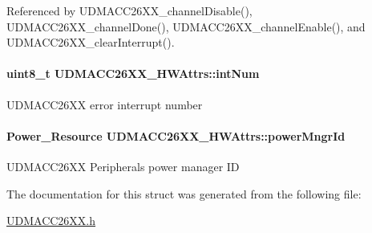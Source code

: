 Referenced by U\+D\+M\+A\+C\+C26\+X\+X\+\_\+channel\+Disable(), U\+D\+M\+A\+C\+C26\+X\+X\+\_\+channel\+Done(), U\+D\+M\+A\+C\+C26\+X\+X\+\_\+channel\+Enable(), and U\+D\+M\+A\+C\+C26\+X\+X\+\_\+clear\+Interrupt().

\paragraph[{int\+Num}]{\setlength{\rightskip}{0pt plus 5cm}uint8\+\_\+t U\+D\+M\+A\+C\+C26\+X\+X\+\_\+\+H\+W\+Attrs\+::int\+Num}\label{struct_u_d_m_a_c_c26_x_x___h_w_attrs_a842b5f7c2c0a2563eaf6f037cff07785}
U\+D\+M\+A\+C\+C26\+X\+X error interrupt number 
\paragraph[{power\+Mngr\+Id}]{\setlength{\rightskip}{0pt plus 5cm}Power\+\_\+\+Resource U\+D\+M\+A\+C\+C26\+X\+X\+\_\+\+H\+W\+Attrs\+::power\+Mngr\+Id}\label{struct_u_d_m_a_c_c26_x_x___h_w_attrs_a3dd30c452d16f3ffa55696fc15852c0b}
U\+D\+M\+A\+C\+C26\+X\+X Peripheral\textquotesingle{}s power manager I\+D 

The documentation for this struct was generated from the following file\+:\begin{DoxyCompactItemize}
\item 
\hyperlink{_u_d_m_a_c_c26_x_x_8h}{U\+D\+M\+A\+C\+C26\+X\+X.\+h}\end{DoxyCompactItemize}
